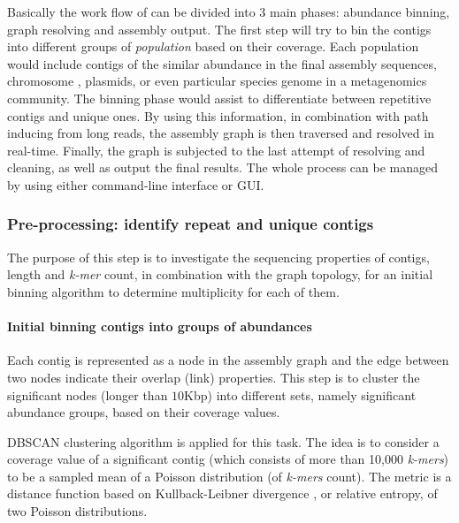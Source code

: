 Basically the work flow of \npgraph{} can be divided into 3 main phases: abundance binning, graph resolving and assembly output. 
The first step will try to bin the contigs into different groups of \emph{population} based on their coverage. 
Each population would include contigs of the similar abundance in the final assembly sequences, \EG{} chromosome , plasmids, or even particular species genome in a metagenomics community.
The binning phase would assist to differentiate between repetitive contigs and unique ones. By using this information, in combination with path inducing from long reads, the assembly graph is then traversed and resolved in real-time. Finally, the graph is subjected to the last attempt of resolving and cleaning, as well as output the final results. The whole process can be managed by using either command-line interface or GUI.
\subsubsection{Pre-processing: identify repeat and unique contigs}
The purpose of this step is to investigate the sequencing properties of contigs, \IE{} length and \emph{k-mer} count, in combination with the graph topology, for an initial binning algorithm to determine multiplicity for each of them.

\paragraph{Initial binning contigs into groups of abundances}
Each contig is represented as a node in the assembly graph and the edge between two nodes indicate their overlap (link) properties.
This step is to cluster the significant nodes (longer than $10$Kbp) into different sets, namely significant abundance groups, based on their coverage values. 

DBSCAN clustering algorithm \cite{Ester96adensity-based} is applied for this task.
The idea is to consider a coverage value of a significant contig (which consists of more than 10,000 \emph{k-mers}) to be a sampled mean of a Poisson distribution (of \emph{k-mers} count). 
The metric is a distance function based on Kullback-Leibner divergence \cite{Kullback1951information}, or relative entropy, of two Poisson distributions.

